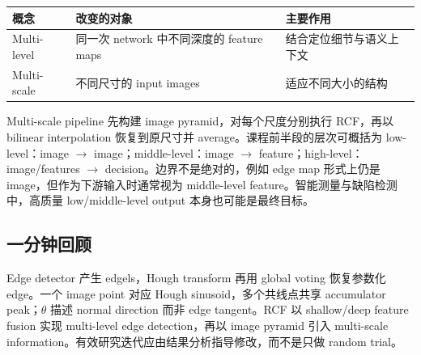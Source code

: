 \begin{center}
\begin{tabular}{lll}
  \toprule
  概念 & 改变的对象 & 主要作用 \\
  \midrule
  Multi-level & 同一次 network 中不同深度的 feature maps & 结合定位细节与语义上下文 \\
  Multi-scale & 不同尺寸的 input images & 适应不同大小的结构 \\
  \bottomrule
\end{tabular}
\end{center}

Multi-scale pipeline 先构建 image pyramid，对每个尺度分别执行 RCF，再以 bilinear interpolation 恢复到原尺寸并 average。课程前半段的层次可概括为 low-level：image $\to$ image；middle-level：image $\to$ feature；high-level：image/features $\to$ decision。边界不是绝对的，例如 edge map 形式上仍是 image，但作为下游输入时通常视为 middle-level feature。智能测量与缺陷检测中，高质量 low/middle-level output 本身也可能是最终目标。

\subsection{一分钟回顾}

Edge detector 产生 edgels，Hough transform 再用 global voting 恢复参数化 edge。一个 image point 对应 Hough sinusoid，多个共线点共享 accumulator peak；$\theta$ 描述 normal direction 而非 edge tangent。RCF 以 shallow/deep feature fusion 实现 multi-level edge detection，再以 image pyramid 引入 multi-scale information。有效研究迭代应由结果分析指导修改，而不是只做 random trial。
